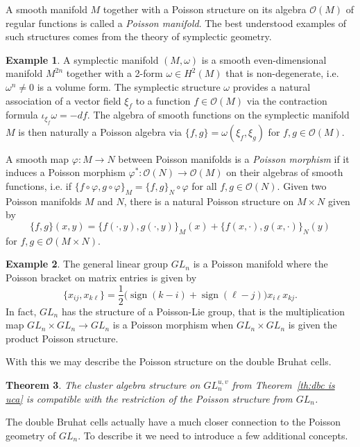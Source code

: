 \documentclass{amsart}
\newtheorem{theorem}{Theorem}[section]
\theoremstyle{definition}
\newtheorem{example}[theorem]{Example}
\theoremstyle{remark}
\numberwithin{equation}{section}
\newcommand{\cO}{{\mathcal{O}}}
\newcommand{\sgn}{\operatorname{sign}}
\begin{document}
  A smooth manifold $M$ together with a Poisson structure on its algebra $\cO(M)$ of regular functions is called a \emph{Poisson manifold}.  The best understood examples of such structures comes from the theory of symplectic geometry.
  \begin{example}
    A symplectic manifold $(M,\omega)$ is a smooth even-dimensional manifold $M^{2n}$ together with a 2-form $\omega\in H^2(M)$ that is non-degenerate, i.e. $\omega^n\ne0$ is a volume form.  The symplectic structure $\omega$ provides a natural association of a vector field $\xi_f$ to a function $f\in\cO(M)$ via the contraction formula $\iota_{\xi_f}\omega=-df$.  The algebra of smooth functions on the symplectic manifold $M$ is then naturally a Poisson algebra via $\{f,g\}=\omega(\xi_f,\xi_g)$ for $f,g\in\cO(M)$.
  \end{example}  
  A smooth map $\varphi:M\to N$ between Poisson manifolds is a \emph{Poisson morphism} if it induces a Poisson morphism $\varphi^*:\cO(N)\to\cO(M)$ on their algebras of smooth functions, i.e. if $\{f \circ \varphi,g \circ \varphi\}_M=\{f,g\}_N\circ\varphi$ for all $f,g\in \cO(N)$.  Given two Poisson manifolds $M$ and $N$, there is a natural Poisson structure on $M\times N$ given by
  \[\{f,g\}(x,y)=\{f(\cdot,y),g(\cdot,y)\}_M(x)+\{f(x,\cdot),g(x,\cdot)\}_N(y)\]
  for $f,g\in\cO(M\times N)$.
  \begin{example}
    The general linear group $GL_n$ is a Poisson manifold where the Poisson bracket on matrix entries is given by
    \begin{equation}
      \{x_{ij},x_{k\ell}\}=\frac{1}{2}\big(\sgn(k-i)+\sgn(\ell-j)\big)x_{i\ell}x_{kj}.
    \end{equation}
    In fact, $GL_n$ has the structure of a Poisson-Lie group, that is the multiplication map $GL_n\times GL_n\to GL_n$ is a Poisson morphism when $GL_n\times GL_n$ is given the product Poisson structure.
  \end{example}
  With this we may describe the Poisson structure on the double Bruhat cells.
  \begin{theorem}\cite{GSV10}
    The cluster algebra structure on $GL_n^{u,v}$ from Theorem~\ref{th:dbc is uca} is compatible with the restriction of the Poisson structure from $GL_n$.
  \end{theorem}

  The double Bruhat cells actually have a much closer connection to the Poisson geometry of $GL_n$.  To describe it we need to introduce a few additional concepts.
\end{document}
